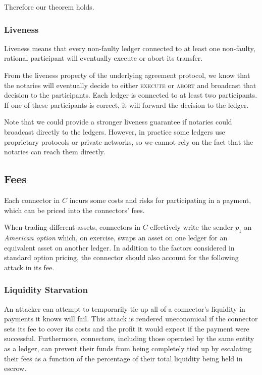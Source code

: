 \documentclass[letterpaper,twocolumn,10pt]{article}
\begin{document}
Therefore our theorem holds.

\subsubsection{Liveness}

Liveness means that every non-faulty ledger connected to at least one non-faulty, rational participant will eventually execute or abort its transfer.

From the liveness property of the underlying agreement protocol, we know that the notaries will eventually decide to either \textsc{execute} or \textsc{abort} and broadcast that decision to the participants. Each ledger is connected to at least two participants. If one of these participants is correct, it will forward the decision to the ledger.

Note that we could provide a stronger liveness guarantee if notaries could broadcast directly to the ledgers. However, in practice some ledgers use proprietary protocols or private networks, so we cannot rely on the fact that the notaries can reach them directly.



\subsection{Fees}
\label{subsec:fees}

Each connector in $C$ incurs some costs and risks for participating in a payment, which can be priced into the connectors' fees.

When trading different assets, connectors in $C$ effectively write the sender $p_1$ an \textit{American option} \cite{black1973pricing}\cite{brennan1977valuation}
which, on exercise, swaps an asset on one ledger for an equivalent asset on another ledger.
In addition to the factors considered in standard option pricing, the connector should also account for the following attack in its fee.

\subsubsection{Liquidity Starvation}

An attacker can attempt to temporarily tie up all of a connector's liquidity in payments it knows will fail. This attack is rendered uneconomical if the connector sets its fee to cover its costs and the profit it would expect if the payment were successful. Furthermore, connectors, including those operated by the same entity as a ledger, can prevent their funds from being completely tied up by escalating their fees as a function of the percentage of their total liquidity being held in escrow.
\end{document}
